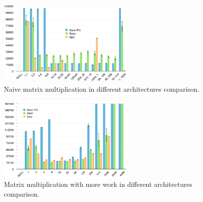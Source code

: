 









\begin{figure}[!h]
    \centering
    \includegraphics[width=0.6\textwidth]{figures/naive_comp.png}
    \caption{Naive matrix multiplication in different architectures comparison.}
    \label{NaiveComp}
\end{figure}

\begin{figure}[!h]
    \centering
    \includegraphics[width=0.6\textwidth]{figures/opt1_comp.png}
    \caption{Matrix multiplication with more work in different architectures comparison.}
    \label{MoreWorkComp}
\end{figure}

